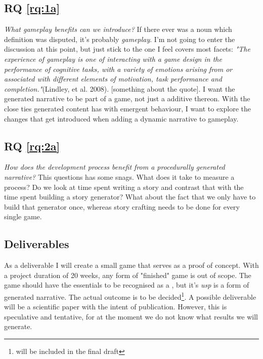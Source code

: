 \subsection{RQ \ref{rq:1a}}
\textit{What gameplay benefits can we introduce?}
If there ever was a noun which definition was disputed, it's probably \textit{gameplay}. I'm not going to enter the discussion at this point, but just stick to the one I feel covers most facets: \textit{"The experience of gameplay is one of interacting with a game design in the performance of cognitive tasks, with a variety of emotions arising from or associated with different elements of motivation, task performance and completion."}(Lindley, et al. 2008). [something about the quote].
I want the generated narrative to be part of a game, not just a additive thereon. With the close ties generated content has with emergent behaviour, I want to explore the changes that get introduced when adding a dynamic narrative to gameplay.

\subsection{RQ \ref{rq:2a}}
\textit{How does the development process benefit from a procedurally generated narrative?} This questions has some snags. What does it take to measure a process? Do we look at time spent writing a story and contrast that with the time spent building a story generator? What about the fact that we only have to build that generator once, whereas story crafting needs to be done for every single game.

\subsection{Deliverables}
As a deliverable I will create a small \rogue game that serves as a proof of concept. With a project duration of 20 weeks, any form of "finished" game is out of scope. The game should have the essentials to be recognised as a \rogue, but it's \textit{usp} is a form of generated narrative. The actual outcome is to be decided\footnote{\label{ln1}will be included in the final draft}. A possible deliverable will be a scientific paper with the intent of publication. However, this is speculative and tentative, for at the moment we do not know what results we will generate\footnotemark[5].
